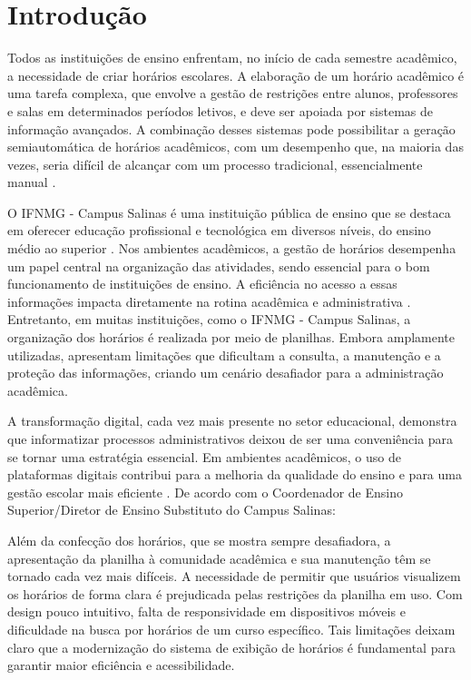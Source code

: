 \chapter{Introdução} 
\label{cap1_introducao} 

Todos as instituições de ensino enfrentam, no início de cada semestre acadêmico, a necessidade de criar horários escolares. A elaboração de um horário acadêmico é uma tarefa complexa, que envolve a gestão de restrições entre alunos, professores e salas em determinados períodos letivos, e deve ser apoiada por sistemas de informação avançados. A combinação desses sistemas pode possibilitar a geração semiautomática de horários acadêmicos, com um desempenho que, na maioria das vezes, seria difícil de alcançar com um processo tradicional, essencialmente manual \cite{passos2016}.

O IFNMG - Campus Salinas é uma instituição pública de ensino que se destaca em oferecer educação profissional e tecnológica em diversos níveis, do ensino médio ao superior \cite{ifnmgsalinas2014}. Nos ambientes acadêmicos, a gestão de horários desempenha um papel central na organização das atividades, sendo essencial para o bom funcionamento de instituições de ensino. A eficiência no acesso a essas informações impacta diretamente na rotina acadêmica e administrativa \cite{Urania2024}. Entretanto, em muitas instituições, como o IFNMG - Campus Salinas, a organização dos horários é realizada por meio de planilhas. Embora amplamente utilizadas, apresentam limitações que dificultam a consulta, a manutenção e a proteção das informações, criando um cenário desafiador para a administração acadêmica.

A transformação digital, cada vez mais presente no setor educacional, demonstra que informatizar processos administrativos deixou de ser uma conveniência para se tornar uma estratégia essencial. Em ambientes acadêmicos, o uso de plataformas digitais contribui para a melhoria da qualidade do ensino e para uma gestão escolar mais eficiente \cite{Educacional2023}. De acordo com o Coordenador de Ensino Superior/Diretor de Ensino Substituto do Campus Salinas:

\begin{citacao}
Além da confecção dos horários, que se mostra sempre desafiadora, a apresentação da planilha à comunidade acadêmica e sua manutenção têm se tornado cada vez mais difíceis. A necessidade de permitir que usuários visualizem os horários de forma clara é prejudicada pelas restrições da planilha em uso. Com design pouco intuitivo, falta de responsividade em dispositivos móveis e dificuldade na busca por horários de um curso específico. Tais limitações deixam claro que a modernização do sistema de exibição de horários é fundamental para garantir maior eficiência e acessibilidade.
\end{citacao}

